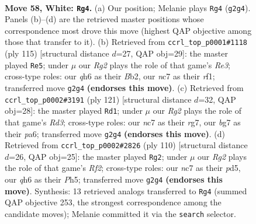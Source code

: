 \documentclass[11pt]{article}
\begin{document}
\clearpage

\begin{figure}[p]\centering
\begin{subfigure}{0.46\textwidth}\centering
\resizebox{\linewidth}{!}{%
\newchessgame
\chessboard[
  setfen={5k2/2n2pb1/7q/3P4/8/8/5KR1/8 w - - 2 58},
  showmover=false,
  pgfstyle=straightmove, color=movearrow, markmove={g2-g4}
]}
\caption{}
\end{subfigure}\hfill
\begin{subfigure}{0.46\textwidth}\centering
\resizebox{\linewidth}{!}{%
\newchessgame
\chessboard[
  setfen={8/4k3/4r3/6P1/8/3K4/1b2Bp2/5R2 b - - 2 58},
  showmover=false,
  pgfstyle=straightmove, color=movearrow, markmove={e6-e5}
]}
\caption{}
\end{subfigure}
\\[4pt]
\begin{subfigure}{0.46\textwidth}\centering
\resizebox{\linewidth}{!}{%
\newchessgame
\chessboard[
  setfen={3k4/6R1/P2r4/1B6/2K5/8/8/6b1 b - - 2 61},
  showmover=false,
  pgfstyle=straightmove, color=movearrow, markmove={d6-d1}
]}
\caption{}
\end{subfigure}\hfill
\begin{subfigure}{0.46\textwidth}\centering
\resizebox{\linewidth}{!}{%
\newchessgame
\chessboard[
  setfen={8/4k3/4pb1p/3p3P/3P4/8/4KR2/8 w - - 15 56},
  showmover=false,
  pgfstyle=straightmove, color=movearrow, markmove={f2-g2}
]}
\caption{}
\end{subfigure}
\caption{\textbf{Move 58, White: \texttt{Rg4}.} (a) Our position; Melanie plays \texttt{Rg4} (\texttt{g2g4}). Panels (b)--(d) are the retrieved master positions whose correspondence most drove this move (highest QAP objective among those that transfer to it). (b) Retrieved from \texttt{ccrl\_top\_p0001\#1118} (ply 115) [structural distance $d$=27, QAP obj=29]: the master played \texttt{Re5}; under $\mu$ our \emph{Rg2} plays the role of that game's \emph{Re3}; cross-type roles: our \emph{q}h6 as their \emph{B}b2, our \emph{n}c7 as their \emph{r}f1; transferred move \texttt{g2g4} \textbf{(endorses this move)}. (c) Retrieved from \texttt{ccrl\_top\_p0002\#3191} (ply 121) [structural distance $d$=32, QAP obj=28]: the master played \texttt{Rd1}; under $\mu$ our \emph{Rg2} plays the role of that game's \emph{Rd3}; cross-type roles: our \emph{n}c7 as their \emph{r}g7, our \emph{b}g7 as their \emph{p}a6; transferred move \texttt{g2g4} \textbf{(endorses this move)}. (d) Retrieved from \texttt{ccrl\_top\_p0002\#2826} (ply 110) [structural distance $d$=26, QAP obj=25]: the master played \texttt{Rg2}; under $\mu$ our \emph{Rg2} plays the role of that game's \emph{Rf2}; cross-type roles: our \emph{n}c7 as their \emph{p}d5, our \emph{q}h6 as their \emph{P}h5; transferred move \texttt{g2g4} \textbf{(endorses this move)}. Synthesis: 13 retrieved analogs transferred to \texttt{Rg4} (summed QAP objective 253, the strongest correspondence among the candidate moves); Melanie committed it via the \texttt{search} selector.}
\label{fig:thought-m114}
\end{figure}
\end{document}
